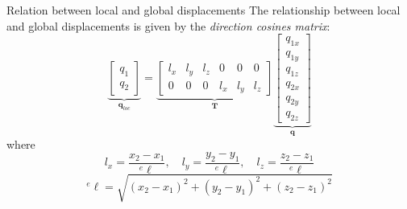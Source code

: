 \documentclass[aspectratio=169]{beamer}
\begin{document}
\begin{frame}{Relation between local and global displacements}
  The relationship between local and global displacements is given by the \emph{direction cosines matrix}:
  $$\underbrace{\begin{bmatrix}
        q_1 \\ q_2
      \end{bmatrix}}_\text{$\mathbf q_{loc}$}=\underbrace{\begin{bmatrix}
        l_x & l_y & l_z & 0   & 0   & 0   \\
        0   & 0   & 0   & l_x & l_y & l_z
      \end{bmatrix}}_\text{$\mathbf T$}\underbrace{\begin{bmatrix}
        q_{1x} \\ q_{1y} \\ q_{1z} \\ q_{2x} \\ q_{2y} \\ q_{2z}
      \end{bmatrix}}_\text{$\mathbf q$}
  $$
  where
  $$l_x=\frac{x_2-x_1}{{}^e\ell},\quad l_y=\frac{y_2-y_1}{{}^e\ell},\quad l_z=\frac{z_2-z_1}{{}^e\ell}$$
  \vspace{0.1cm}
  $$^e\ell=\sqrt{(x_2-x_1)^2+(y_2-y_1)^2+(z_2-z_1)^2}$$

\end{frame}
\end{document}
